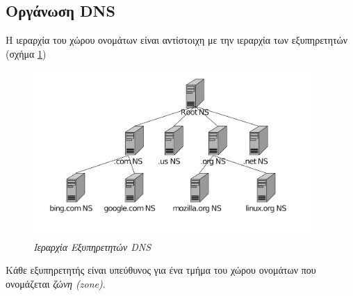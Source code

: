 %
%
\subsection{Οργάνωση DNS}

Η ιεραρχία του χώρου ονομάτων είναι αντίστοιχη με την ιεραρχία των εξυπηρετητών (σχήμα \ref{6-3})

\begin{figure}[!ht]
  \centering
  \includegraphics[width=0.95\textwidth]{images/chapter6/6-3}
  \caption {\textsl{Ιεραρχία Εξυπηρετητών DNS}}
  \label{6-3}
\end{figure}

Κάθε εξυπηρετητής είναι υπεύθυνος για ένα τμήμα του χώρου ονομάτων που ονομάζεται \emph{ζώνη (zone)}.

